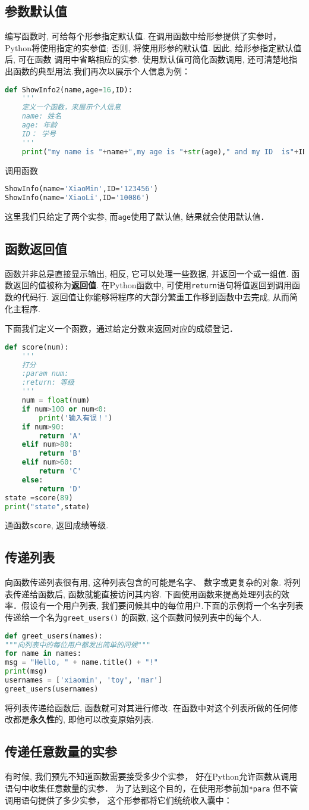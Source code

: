 \subsection{参数默认值}
编写函数时, 可给每个形参指定默认值. 在调用函数中给形参提供了实参时， Python将使用指定的实参值; 否则, 将使用形参的默认值. 因此, 给形参指定默认值后, 可在函数
调用中省略相应的实参. 使用默认值可简化函数调用, 还可清楚地指出函数的典型用法.我们再次以展示个人信息为例：
\begin{lstlisting}[language=python]
def ShowInfo2(name,age=16,ID):
    '''
    定义一个函数，来展示个人信息
    name: 姓名
    age: 年龄
    ID： 学号
    '''
    print("my name is "+name+",my age is "+str(age)," and my ID  is"+ID)
\end{lstlisting}
调用函数
\begin{lstlisting}[language=python]
ShowInfo(name='XiaoMin',ID='123456')
ShowInfo(name='XiaoLi',ID='10086')
\end{lstlisting}
这里我们只给定了两个实参, 而\verb|age|使用了默认值, 结果就会使用默认值．

\subsection{函数返回值}
函数并非总是直接显示输出, 相反, 它可以处理一些数据, 并返回一个或一组值. 函数返回的值被称为\textbf{返回值}. 在Python函数中, 可使用\verb|return|语句将值返回到调用函数的代码行. 返回值让你能够将程序的大部分繁重工作移到函数中去完成, 从而简化主程序.

下面我们定义一个函数，通过给定分数来返回对应的成绩登记．
\begin{lstlisting}[language=python]
def score(num):
    '''
    打分
    :param num:
    :return: 等级
    '''
    num = float(num)
    if num>100 or num<0:
        print('输入有误！')
    if num>90:
        return 'A'
    elif num>80:
        return 'B'
    elif num>60:
        return 'C'
    else:
        return 'D'
state =score(89)
print("state",state)
\end{lstlisting}
通函数\verb|score|, 返回成绩等级.

\subsection{传递列表}
向函数传递列表很有用, 这种列表包含的可能是名字、 数字或更复杂的对象. 将列表传递给函数后, 函数就能直接访问其内容. 下面使用函数来提高处理列表的效率．假设有一个用户列表, 我们要问候其中的每位用户.下面的示例将一个名字列表传递给一个名为\verb|greet_users()| 的函数, 这个函数问候列表中的每个人.
\begin{lstlisting}[language=python]
def greet_users(names):
"""向列表中的每位用户都发出简单的问候"""
for name in names:
msg = "Hello, " + name.title() + "!"
print(msg)
usernames = ['xiaomin', 'toy', 'mar']
greet_users(usernames)
\end{lstlisting}
将列表传递给函数后, 函数就可对其进行修改. 在函数中对这个列表所做的任何修改都是\textbf{永久性}的, 即他可以改变原始列表.

\subsection{传递任意数量的实参}
有时候, 我们预先不知道函数需要接受多少个实参， 好在Python允许函数从调用语句中收集任意数量的实参． 为了达到这个目的，在使用形参前加\verb|*para| 但不管调用语句提供了多少实参， 这个形参都将它们统统收入囊中：
